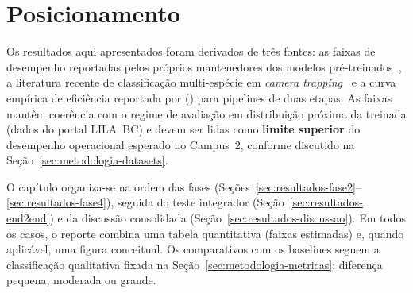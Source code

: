 \section{Posicionamento}
\label{sec:resultados-posicionamento}


Os resultados aqui apresentados foram derivados de três fontes: as faixas de desempenho reportadas pelos próprios mantenedores dos modelos pré-treinados~\cite{shinoda2024petface,adam2024wildlifereid10k,akbar2025bodypart}, a literatura recente de classificação multi-espécie em \emph{camera trapping}~\cite{tabak2019nacti,norouzzadeh2018automatically} e a curva empírica de eficiência reportada por \citeauthor{velez2022choosing} (\citeyear{velez2022choosing}) para pipelines de duas etapas. As faixas mantêm coerência com o regime de avaliação em distribuição próxima da treinada (dados do portal LILA~BC) e devem ser lidas como \textbf{limite superior} do desempenho operacional esperado no Campus~2, conforme discutido na Seção~\ref{sec:metodologia-datasets}.

O capítulo organiza-se na ordem das fases (Seções~\ref{sec:resultados-fase2}--\ref{sec:resultados-fase4}), seguida do teste integrador (Seção~\ref{sec:resultados-end2end}) e da discussão consolidada (Seção~\ref{sec:resultados-discussao}). Em todos os casos, o reporte combina uma tabela quantitativa (faixas estimadas) e, quando aplicável, uma figura conceitual. Os comparativos com os baselines seguem a classificação qualitativa fixada na Seção~\ref{sec:metodologia-metricas}: diferença pequena, moderada ou grande.

